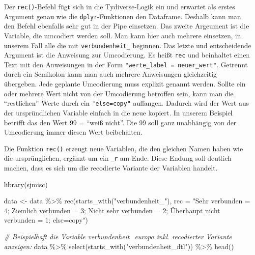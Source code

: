 \documentclass[
]{book}
\newenvironment{Shaded}{\begin{snugshade}}{\end{snugshade}}
\newcommand{\AttributeTok}[1]{\textcolor[rgb]{0.77,0.63,0.00}{#1}}
\newcommand{\CommentTok}[1]{\textcolor[rgb]{0.56,0.35,0.01}{\textit{#1}}}
\newcommand{\FunctionTok}[1]{\textcolor[rgb]{0.00,0.00,0.00}{#1}}
\newcommand{\NormalTok}[1]{#1}
\newcommand{\OtherTok}[1]{\textcolor[rgb]{0.56,0.35,0.01}{#1}}
\newcommand{\SpecialCharTok}[1]{\textcolor[rgb]{0.00,0.00,0.00}{#1}}
\newcommand{\StringTok}[1]{\textcolor[rgb]{0.31,0.60,0.02}{#1}}
\begin{document}
Der \texttt{rec()}-Befehl fügt sich in die Tydiverse-Logik ein und erwartet als erstes Argument genau wie die \texttt{dplyr}-Funktionen den Dataframe. Deshalb kann man den Befehl ebenfalls sehr gut in der Pipe einsetzen. Das zweite Argeument ist die Variable, die umcodiert werden soll. Man kann hier auch mehrere einsetzen, in unserem Fall alle die mit \texttt{verbundenheit\_} beginnen. Das letzte und entscheidende Argument ist die Anweisung zur Umcodierung. Es heißt \texttt{rec} und beinhaltet einen Text mit den Anweisungen in der Form \texttt{"werte\_label\ =\ neuer\_wert"}. Getrennt durch ein Semikolon kann man auch mehrere Anweisungen gleichzeitig übergeben. Jede geplante Umcodierung muss explizit genannt werden. Sollte ein oder mehrere Wert nicht von der Umcodierung betroffen sein, kann man die ``restlichen'' Werte durch ein \texttt{"else=copy"} auffangen. Dadurch wird der Wert aus der urspründlichen Variable einfach in die neue kopiert. In unserem Beispiel betrifft das den Wert 99 = ``weiß nicht''. Die 99 soll ganz unabhängig von der Umcodierung immer diesen Wert beibehalten.

Die Funktion \texttt{rec()} erzeugt neue Variablen, die den gleichen Namen haben wie die ursprünglichen, ergänzt um ein \texttt{\_r} am Ende. Diese Endung soll deutlich machen, dass es sich um die recodierte Variante der Variablen handelt.

\begin{Shaded}
\begin{Highlighting}[]
\FunctionTok{library}\NormalTok{(sjmisc)}

\NormalTok{data }\OtherTok{\textless{}{-}}\NormalTok{ data }\SpecialCharTok{\%\textgreater{}\%} 
  \FunctionTok{rec}\NormalTok{(}\FunctionTok{starts\_with}\NormalTok{(}\StringTok{"verbundenheit\_"}\NormalTok{), }\AttributeTok{rec =} \StringTok{"Sehr verbunden = 4;}
\StringTok{                                             Ziemlich verbunden = 3;}
\StringTok{                                             Nicht sehr verbunden = 2; }
\StringTok{                                             Überhaupt nicht verbunden = 1;}
\StringTok{                                             else=copy"}\NormalTok{) }

\CommentTok{\# Beispielhaft die Variable verbundenheit\_europa inkl. recodierter Variante anzeigen:}
\NormalTok{data }\SpecialCharTok{\%\textgreater{}\%} 
  \FunctionTok{select}\NormalTok{(}\FunctionTok{starts\_with}\NormalTok{(}\StringTok{"verbundenheit\_dtl"}\NormalTok{)) }\SpecialCharTok{\%\textgreater{}\%} 
  \FunctionTok{head}\NormalTok{()}
\end{Highlighting}
\end{Shaded}
\end{document}
